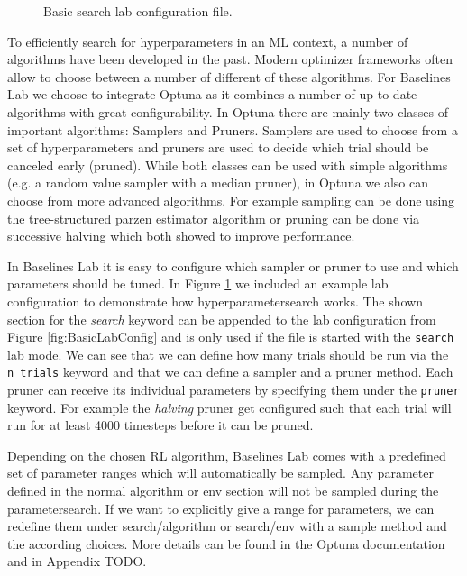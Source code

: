 \begin{figure}[ht]
    
    \caption{Basic search lab configuration file.}
    \label{fig:BasicSearchConfig}
\end{figure}

To efficiently search for hyperparameters in an ML context, a number of algorithms have been developed in the past. Modern optimizer frameworks often allow to choose between a number of different of these algorithms. For Baselines Lab we choose to integrate Optuna \cite{akiba2019optuna} as it combines a number of up-to-date algorithms with great configurability. In Optuna there are mainly two classes of important algorithms: Samplers and Pruners. Samplers are used to choose from a set of hyperparameters and pruners are used to decide which trial should be canceled early (pruned). While both classes can be used with simple algorithms (e.g. a random value sampler with a median pruner), in Optuna we also can choose from more advanced algorithms. For example sampling can be done using the tree-structured parzen estimator algorithm \cite{bergstra2011algorithms} or pruning can be done via successive halving \cite{karnin2013almost} which both showed to improve performance.

In Baselines Lab it is easy to configure which sampler or pruner to use and which parameters should be tuned. In Figure \ref{fig:BasicSearchConfig} we included an example lab configuration to demonstrate how hyperparametersearch works. The shown section for the \textit{search} keyword can be appended to the lab configuration from Figure \ref{fig:BasicLabConfig} and is only used if the file is started with the \texttt{search} lab mode. We can see that we can define how many trials should be run via the \texttt{n\_trials} keyword and that we can define a sampler and a pruner method. Each pruner can receive its individual parameters by specifying them under the \texttt{pruner} keyword. For example the \textit{halving} pruner get configured such that each trial will run for at least 4000 timesteps before it can be pruned.

Depending on the chosen RL algorithm, Baselines Lab comes with a predefined set of parameter ranges which will automatically be sampled. Any parameter defined in the normal algorithm or env section will not be sampled during the parametersearch. If we want to explicitly give a range for parameters, we can redefine them under search/algorithm or search/env with a sample method and the according choices. More details can be found in the Optuna documentation \cite{optuna-docs} and in Appendix TODO.

